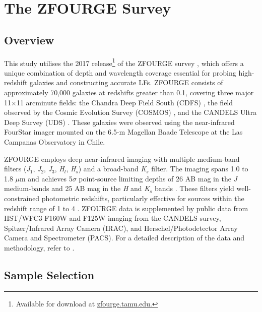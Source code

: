 \section{The ZFOURGE Survey} \label{Sec: The ZFOURGE Survey}
\subsection{Overview}

This study utilises the 2017 release\footnote{Available for download at \href{https://zfourge.tamu.edu/}{zfourge.tamu.edu.}} of the ZFOURGE survey \citep{straatman_fourstar_2016}, which offers a unique combination of depth and wavelength coverage essential for probing high-redshift galaxies and constructing accurate LFs. ZFOURGE consists of approximately 70,000 galaxies at redshifts greater than 0.1, covering three major 11$\times$11 arcminute fields: the Chandra Deep Field South (CDFS) \citep{giacconi_chandra_2002}, the field observed by the Cosmic Evolution Survey (COSMOS) \citep{scoville_cosmic_2007}, and the CANDELS Ultra Deep Survey (UDS) \citep{lawrence_ukirt_2007}. These galaxies were observed using the near-infrared FourStar imager \citep{persson_fourstar_2013} mounted on the 6.5-m Magellan Baade Telescope at the Las Campanas Observatory in Chile.  

ZFOURGE employs deep near-infrared imaging with multiple medium-band filters (\textit{J}$_{1}$, \textit{J}$_2$, \textit{J}$_{3}$, \textit{H}$_{l}$, \textit{H}$_{s}$) and a broad-band \textit{K}$_{s}$ filter. The imaging spans 1.0 to 1.8 $\mu$m and achieves 5$\sigma$ point-source limiting depths of 26 AB mag in the \textit{J} medium-bands and 25 AB mag in the \textit{H} and \textit{K}$_{s}$ bands \citep{spitler_first_2012}. These filters yield well-constrained photometric redshifts, particularly effective for sources within the redshift range of 1 to 4 \citep{spitler_first_2012}. ZFOURGE data is supplemented by public data from HST/WFC3 F160W and F125W imaging from the CANDELS survey, Spitzer/Infrared Array Camera (IRAC), and Herschel/Photodetector Array Camera and Spectrometer (PACS). For a detailed description of the data and methodology, refer to \cite{straatman_fourstar_2016}.

\subsection{Sample Selection} \label{Sec: Sample Selection}
